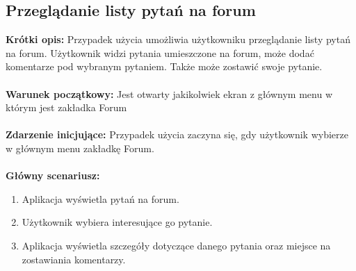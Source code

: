 \documentclass[10pt,a4paper]{report}
\begin{document}
\begin{adjustwidth}{2cm}{2cm}
\subsection{Przeglądanie listy pytań na forum}
\begin{minipage}{1\linewidth}
\textbf{Krótki opis:} Przypadek użycia umożliwia użytkowniku przeglądanie listy pytań na forum. Użytkownik widzi pytania umieszczone na forum, może dodać komentarze pod wybranym pytaniem. Także może zostawić swoje pytanie.   \\ \\
\textbf{Warunek początkowy:} Jest otwarty jakikolwiek ekran z głównym menu w którym jest zakładka Forum \\ \\
\textbf{Zdarzenie inicjujące:} Przypadek użycia zaczyna się, gdy użytkownik wybierze w głównym menu zakładkę Forum. \\ \\
\textbf{Główny scenariusz:} 
\begin{enumerate}
\setlength\itemsep{0.2cm}
    \item Aplikacja wyświetla pytań na forum.
    \item Użytkownik wybiera interesujące go pytanie.
    \item Aplikacja wyświetla szczegóły dotyczące danego pytania oraz miejsce na zostawiania komentarzy.
\end{enumerate}
\end{minipage}

\end{adjustwidth}
\end{document}
